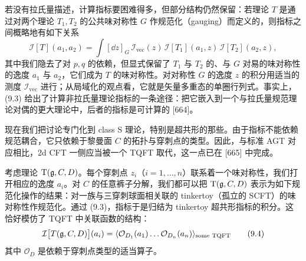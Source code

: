 若没有拉氏量描述，计算指标要困难得多，但部分结构仍然保留：若理论 $T$ 是通过对两个理论 $T_1,T_2$ 的公共味对称性 $G$ 作规范化（gauging）而定义的，则指标之间概略地有如下关系
\begin{equation}
\mathcal{I}[T](a_1,a_2)=\int[\dd z]_G\,\mathcal{I}_{\text{vec}}(z)\,\mathcal{I}[T_1](a_1,z)\,\mathcal{I}[T_2](a_2,z),
\tag{9.3}
\end{equation}
其中我们隐去了对 $p,q$ 的依赖，但显式保留了 $T_1$ 与 $T_2$ 的、与 $G$ 对易的味对称性的逸度 $a_1$ 与 $a_2$，它们成为 $T$ 的味对称性。对对称性 $G$ 的逸度 $z$ 的积分用适当的测度 $\mathcal I_{\text{vec}}$ 进行；从局域化的观点看，它就是矢量多重态的单圈行列式。事实上，(9.3) 给出了计算非拉氏量理论指标的一条途径：把它嵌入到一个与拉氏量规范理论对偶的更大理论中，后者的指标是可计算的 [664]。

现在我们把讨论专门化到 class S 理论，特别是超共形的那些。由于指标不能依赖规范耦合，它只依赖于黎曼面 $C$ 的拓扑与穿刺点的类型。因此，与标准 AGT 对应相比，2d CFT 一侧应当被一个 TQFT 取代，这一点已在 [665] 中完成。

考虑理论 $\mathrm{T}(\mathfrak{g},C,D)$。每个穿刺点 $z_i$（$i=1,\dots,n$）联系着一个味对称性，我们打开相应的逸度 $a_i$。对 $C$ 的任意裤子分解，我们都可以把 $\mathrm{T}(\mathfrak{g},C,D)$ 表示为如下规范化操作的结果：对一族与三穿刺球面相关联的 tinkertoy（孤立的 SCFT）的味对称性作规范化。通过 (9.3)，指标于是归结为 tinkertoy 超共形指标的积分。这恰好模仿了 TQFT 中关联函数的结构：
\begin{equation}
\mathcal{I}\big[T(\mathfrak{g},C,D)\big](a_i)=\langle\mathcal{O}_{D_1}(a_1)\dots\mathcal{O}_{D_n}(a_n)\rangle_{\text{some TQFT}}
\tag{9.4}
\end{equation}
其中 $\mathcal O_D$ 是依赖于穿刺点类型的适当算子。

